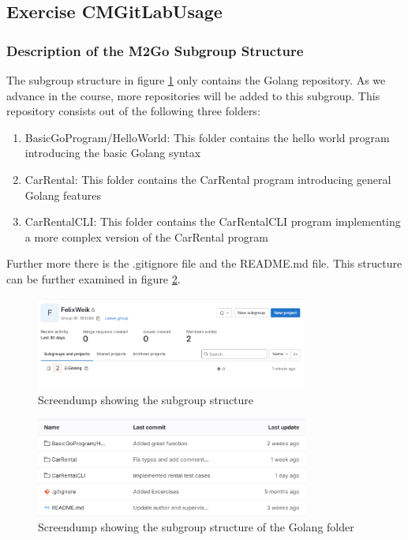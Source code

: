 \label{sec:exercise_cm_gitlab_usage}

\subsection{Exercise CMGitLabUsage}

\subsubsection*{Description of the M2Go Subgroup Structure}
The subgroup structure in figure \ref*{fig:screendump_subgroupStructure} only contains the Golang repository.
As we advance in the course, more repositories will be added to this subgroup.
This repository consists out of the following three folders:
\begin{enumerate}
    \item BasicGoProgram/HelloWorld: This folder contains the hello world program introducing the basic Golang syntax
    \item CarRental: This folder contains the CarRental program introducing general Golang features
    \item CarRentalCLI: This folder contains the CarRentalCLI program implementing a more complex version of the CarRental program
\end{enumerate}
Further more there is the .gitignore file and the README.md file.
This structure can be further examined in figure \ref*{fig:screendump_subsubgroupStructure}.

\begin{figure}[h]
    \centering
    \includegraphics[width=0.8\textwidth]{figures/goLang/golang_personalSubgroupStructure.png}
    \caption{Screendump showing the subgroup structure}
    \label{fig:screendump_subgroupStructure}
\end{figure}

\begin{figure}
    \centering
    \includegraphics[width=0.8\textwidth]{figures/goLang/golang_personalSubsubgroupStructure.png}
    \caption{Screendump showing the subgroup structure of the Golang folder}
    \label{fig:screendump_subsubgroupStructure}
\end{figure}

